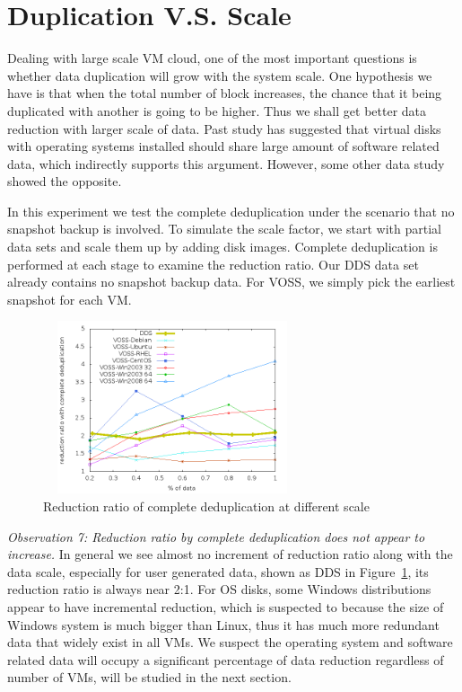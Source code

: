 \section{Duplication V.S. Scale}
\label{sect:scale}
Dealing with large scale VM cloud, one of the most important questions is
whether data duplication will grow with the system scale. 
One hypothesis we have is that when the total number of block increases,
the chance that it being duplicated with another is going to be higher. Thus
we shall get better data reduction with larger scale of data.
Past study\cite{Jin2009} has suggested that virtual disks with 
operating systems installed should share large amount of software related data,
which indirectly supports this argument.
However, some other data study\cite{Jayaram2011} showed the opposite.

In this experiment we test the complete deduplication under the scenario
that no snapshot backup is involved. To simulate the scale factor,
we start with partial data sets and scale them up by adding disk images.
Complete deduplication is performed at each stage to examine the reduction ratio.
Our DDS data set already contains no snapshot backup data. For VOSS, we simply pick
the earliest snapshot for each VM.

\begin{figure}
  \centering
  \includegraphics[width=3in,height=2in]{dedup_ratio.png}
  \caption{Reduction ratio of complete deduplication at different scale}
  \label{fig:scale}
\end{figure}

\emph{Observation 7: Reduction ratio by complete deduplication does not appear to increase.}
In general we see almost no increment of reduction ratio along with the data scale, especially
for user generated data, shown as DDS in Figure~\ref{fig:scale}, its reduction ratio is always
near 2:1. For OS disks, some Windows distributions appear to have incremental reduction, which is suspected to
because the size of Windows system is much bigger than Linux, thus it has much more redundant
data that widely exist in all VMs. We suspect the operating system and software related data
will occupy a significant percentage of data reduction regardless of number of VMs, will 
be studied in the next section.

